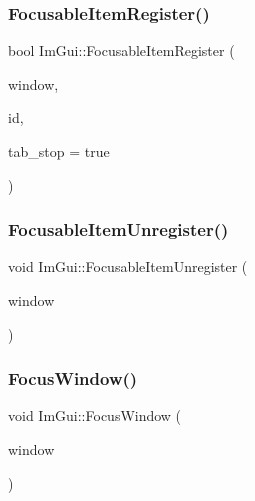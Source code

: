 \subsubsection{\texorpdfstring{Focusable\+Item\+Register()}{FocusableItemRegister()}}
{\footnotesize\ttfamily bool Im\+Gui\+::\+Focusable\+Item\+Register (\begin{DoxyParamCaption}\item[{\mbox{\hyperlink{struct_im_gui_window}{Im\+Gui\+Window}} $\ast$}]{window,  }\item[{\mbox{\hyperlink{imgui_8h_a1785c9b6f4e16406764a85f32582236f}{Im\+Gui\+ID}}}]{id,  }\item[{bool}]{tab\+\_\+stop = {\ttfamily true} }\end{DoxyParamCaption})}

\mbox{\label{namespace_im_gui_a390518fcaef04b4d399d2475d4d84df7}} 
\subsubsection{\texorpdfstring{Focusable\+Item\+Unregister()}{FocusableItemUnregister()}}
{\footnotesize\ttfamily void Im\+Gui\+::\+Focusable\+Item\+Unregister (\begin{DoxyParamCaption}\item[{\mbox{\hyperlink{struct_im_gui_window}{Im\+Gui\+Window}} $\ast$}]{window }\end{DoxyParamCaption})}

\mbox{\label{namespace_im_gui_ade4c08e7e7ad7bbfa4835248f5f3a7c6}} 
\subsubsection{\texorpdfstring{Focus\+Window()}{FocusWindow()}}
{\footnotesize\ttfamily void Im\+Gui\+::\+Focus\+Window (\begin{DoxyParamCaption}\item[{\mbox{\hyperlink{struct_im_gui_window}{Im\+Gui\+Window}} $\ast$}]{window }\end{DoxyParamCaption})}

\mbox{\label{namespace_im_gui_a11837daee819fd90e17d80ab1eef1f99}} 
